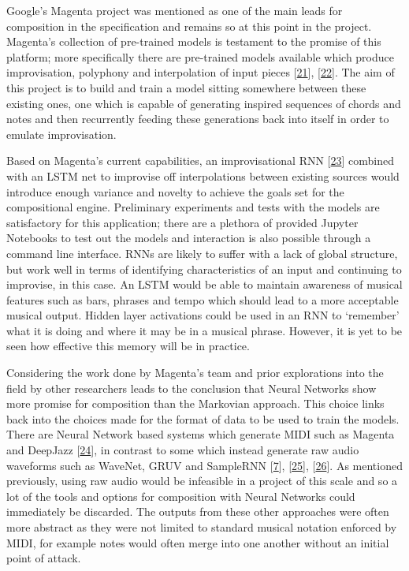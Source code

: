 \documentclass[12pt,]{article}
\begin{document}
Google's Magenta project was mentioned as one of the main leads for
composition in the specification and remains so at this point in the
project. Magenta's collection of pre-trained models is testament to the
promise of this platform; more specifically there are pre-trained models
available which produce improvisation, polyphony and interpolation of
input pieces {[}\protect\hyperlink{ref-magentavae}{21}{]},
{[}\protect\hyperlink{ref-magentapolyphony}{22}{]}. The aim of this
project is to build and train a model sitting somewhere between these
existing ones, one which is capable of generating inspired sequences of
chords and notes and then recurrently feeding these generations back
into itself in order to emulate improvisation.

Based on Magenta's current capabilities, an improvisational RNN
{[}\protect\hyperlink{ref-magentaimprov}{23}{]} combined with an LSTM
net to improvise off interpolations between existing sources would
introduce enough variance and novelty to achieve the goals set for the
compositional engine. Preliminary experiments and tests with the models
are satisfactory for this application; there are a plethora of provided
Jupyter Notebooks to test out the models and interaction is also
possible through a command line interface. RNNs are likely to suffer
with a lack of global structure, but work well in terms of identifying
characteristics of an input and continuing to improvise, in this case.
An LSTM would be able to maintain awareness of musical features such as
bars, phrases and tempo which should lead to a more acceptable musical
output. Hidden layer activations could be used in an RNN to `remember'
what it is doing and where it may be in a musical phrase. However, it is
yet to be seen how effective this memory will be in practice.

Considering the work done by Magenta's team and prior explorations into
the field by other researchers leads to the conclusion that Neural
Networks show more promise for composition than the Markovian approach.
This choice links back into the choices made for the format of data to
be used to train the models. There are Neural Network based systems
which generate MIDI such as Magenta and DeepJazz
{[}\protect\hyperlink{ref-deepjazz}{24}{]}, in contrast to some which
instead generate raw audio waveforms such as WaveNet, GRUV and SampleRNN
{[}\protect\hyperlink{ref-oord2016wavenet}{7}{]},
{[}\protect\hyperlink{ref-Nayebi2015GRUVA}{25}{]},
{[}\protect\hyperlink{ref-mehri2016samplernn}{26}{]}. As mentioned
previously, using raw audio would be infeasible in a project of this
scale and so a lot of the tools and options for composition with Neural
Networks could immediately be discarded. The outputs from these other
approaches were often more abstract as they were not limited to standard
musical notation enforced by MIDI, for example notes would often merge
into one another without an initial point of attack.
\end{document}
